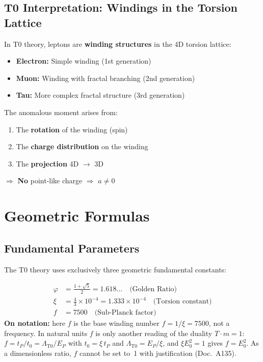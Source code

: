 	\subsection{T0 Interpretation: Windings in the Torsion Lattice}
	
	In T0 theory, leptons are \textbf{winding structures} in the 4D torsion lattice:
	
	\begin{itemize}
		\item \textbf{Electron:} Simple winding (1st generation)
		\item \textbf{Muon:} Winding with fractal branching (2nd generation)
		\item \textbf{Tau:} More complex fractal structure (3rd generation)
	\end{itemize}
	
	The anomalous moment arises from:
	\begin{enumerate}
		\item The \textbf{rotation} of the winding (spin)
		\item The \textbf{charge distribution} on the winding
		\item The \textbf{projection} 4D $\to$ 3D
	\end{enumerate}
	
	$\Rightarrow$ \textbf{No} point-like charge $\Rightarrow$ $a \neq 0$
	
	\section{Geometric Formulas}
	
	\subsection{Fundamental Parameters}
	
	The T0 theory uses exclusively three geometric fundamental constants:
	
	\begin{align}
		\varphi &= \frac{1 + \sqrt{5}}{2} = 1.618\ldots \quad \text{(Golden Ratio)} \\
		\xi &= \frac{4}{3} \times 10^{-4} = 1.333 \times 10^{-4} \quad \text{(Torsion constant)} \\
		f &= 7500 \quad \text{(Sub-Planck factor)}
	\end{align}
	\textbf{On notation:} here $f$ is the base winding number $f = 1/\xi = 7500$, not a frequency. In natural units $f$ is only another reading of the duality $T\cdot m = 1$: $f = t_P/t_0 = \Lambda_{\text{T0}}/E_P$ with $t_0 = \xi\,t_P$ and $\Lambda_{\text{T0}} = E_P/\xi$, and $\xi E_0^2 = 1$ gives $f = E_0^2$. As a dimensionless ratio, $f$ cannot be set to~1 with justification (Doc.~A135).
	
